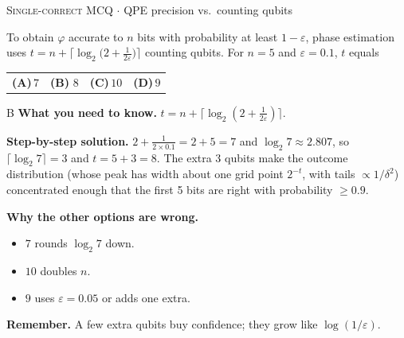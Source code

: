 \documentclass[11pt,a4paper]{article}
\newcommand{\optlabel}[1]{\textbf{(#1)}}
\newcommand{\correctlabel}[1]{\textcolor{okgreen}{\textbf{(#1)}\,\ding{51}}}
\newenvironment{qitem}[1]{\begin{list}{}{\setlength{\leftmargin}{3.3em}\setlength{\labelwidth}{3.1em}%
  \setlength{\labelsep}{0.2em}\setlength{\topsep}{3pt}\setlength{\parsep}{3pt}}\item[\textbf{Q.#1}\hfill]}{\end{list}}
\newcommand{\qsep}{\par\vspace{2pt}{\color{black!15}\hrule}\vspace{4pt}}
\newcommand{\qmeta}[2]{{\footnotesize\color{black!60}\textsc{#1} \;$\cdot$\; #2}\par}
\begin{document}
\begin{qitem}{64}
\qmeta{Single-correct MCQ}{QPE precision vs.\ counting qubits}
To obtain $\varphi$ accurate to $n$ bits with probability at least $1 - \varepsilon$, phase estimation uses
$t = n + \big\lceil \log_2\!\big(2 + \frac{1}{2\varepsilon}\big)\big\rceil$ counting qubits. For $n = 5$ and $\varepsilon = 0.1$, $t$ equals
\par\smallskip\noindent\begin{tabularx}{\linewidth}{@{}*{4}{L}@{}}
\optlabel{A}\,$7$ & \correctlabel{B}\,$8$ & \optlabel{C}\,$10$ & \optlabel{D}\,$9$
\end{tabularx}
\end{qitem}
\begin{solbox}{B}
\textbf{\color{brand}What you need to know.} $t = n + \lceil\log_2(2 + \frac{1}{2\varepsilon})\rceil$.

\textbf{\color{brand}Step-by-step solution.} $2 + \frac{1}{2\times0.1} = 2 + 5 = 7$ and $\log_2 7 \approx 2.807$, so $\lceil\log_2 7\rceil = 3$ and $t = 5 + 3 = 8$.
The extra 3 qubits make the outcome distribution (whose peak has width about one grid point $2^{-t}$, with tails
$\propto 1/\delta^2$) concentrated enough that the first 5 bits are right with probability $\ge 0.9$.

\textbf{\color{brand}Why the other options are wrong.}
\begin{itemize}[leftmargin=2.4em, itemsep=1pt, topsep=2pt]
\item[\textbf{(A)}] $7$ rounds $\log_2 7$ down.
\item[\textbf{(C)}] $10$ doubles $n$.
\item[\textbf{(D)}] $9$ uses $\varepsilon = 0.05$ or adds one extra.
\end{itemize}
\textbf{\color{brand}Remember.} A few extra qubits buy confidence; they grow like $\log(1/\varepsilon)$.
\end{solbox}
\qsep
\end{document}
